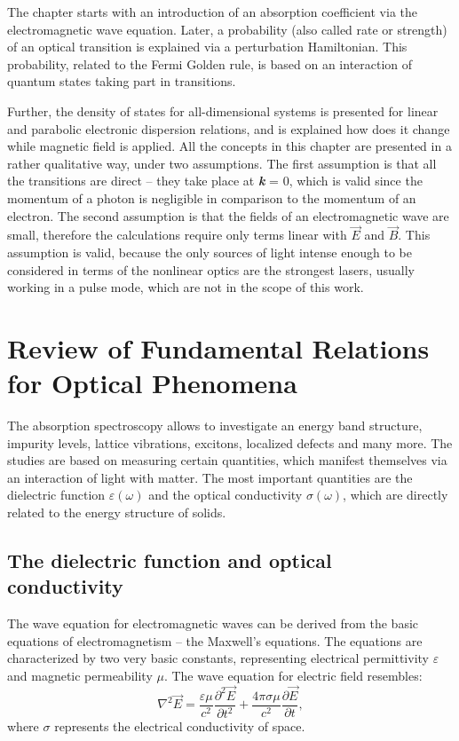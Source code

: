 \documentclass[titlepage,a4paper]{book}
\newcommand{\wciecie}{\quad\phantom{v}}
\begin{document}
The chapter starts with an introduction of an absorption coefficient via the electromagnetic wave equation. Later, a probability (also called rate or strength) of an optical transition is explained via a perturbation Hamiltonian. This probability, related to the Fermi Golden rule, is based on an interaction of quantum states taking part in transitions. 

Further, the density of states for all-dimensional systems is presented for linear and parabolic electronic dispersion relations, and is explained how does it change while magnetic field is applied. All the concepts in this chapter are presented in a rather qualitative way, under two assumptions. The first assumption is that all the transitions are direct -- they take place at \textbf{\textit{k}} = 0, which is valid since the momentum of a photon is negligible in comparison to the momentum of an electron. The second assumption is that the fields of an electromagnetic wave are small, therefore the calculations require only terms linear with $\vec{E}$ and $\vec{B}$. This assumption is valid, because the only sources of light intense enough to be considered in terms of the nonlinear optics are the strongest lasers, usually working in a pulse mode, which are not in the scope of this work. 
 
\section{Review of Fundamental Relations for Optical Phenomena}
\wciecie
The absorption spectroscopy allows to investigate an energy band structure, impurity levels, lattice vibrations, excitons, localized defects and many more. The studies are based on measuring certain quantities, which manifest themselves via an interaction of light with matter. The most important quantities are the dielectric function $\varepsilon (\omega)$ and the optical conductivity $\sigma (\omega)$, which are directly related to the energy structure of solids. 
\subsection{The dielectric function and optical conductivity}
\label{section:Maxwell_equations}
\wciecie
The wave equation for electromagnetic waves can be derived from the basic equations of electromagnetism -- the Maxwell's equations. The equations are characterized by two very basic constants, representing electrical permittivity $\varepsilon$ and magnetic permeability $\mu$. The wave equation for electric field resembles:
\begin{equation}
\label{eq:Wave_E}
\nabla^2 \vec{E} = \frac{\varepsilon \mu}{c^2} \frac{\partial^2 \vec{E}}{\partial t^2} + \frac{4\pi \sigma \mu}{c^2} \frac{\partial \vec{E}}{\partial t},
\end{equation}
where $\sigma$ represents the electrical conductivity of space. 
\end{document}
